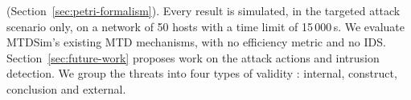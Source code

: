 \documentclass{cshonours}
\begin{document}
(Section~\ref{sec:petri-formalism}). Every result is simulated, in the
targeted attack scenario only, on a network of 50 hosts with a time limit of
15\,000\,s. We evaluate MTDSim's existing MTD mechanisms, with no efficiency
metric and no IDS. Section~\ref{sec:future-work} proposes work on the attack
actions and intrusion detection.
We group the threats
into four types of validity \citep{wohlin2012}: internal, construct,
conclusion and external.
\end{document}
